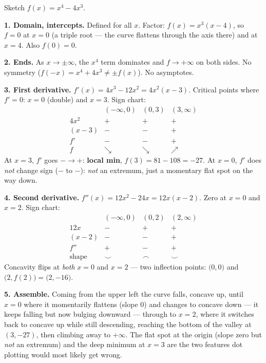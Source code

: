\begin{example}\label{ch16:ex-sketch-quartic}
Sketch $f(x)=x^4-4x^3$.

\smallskip
\textbf{1. Domain, intercepts.} Defined for all $x$. Factor:
$f(x)=x^3(x-4)$, so $f=0$ at $x=0$ (a triple root --- the curve flattens through
the axis there) and at $x=4$. Also $f(0)=0$.

\textbf{2. Ends.} As $x\to\pm\infty$, the $x^4$ term dominates and $f\to+\infty$ on
both sides. No symmetry ($f(-x)=x^4+4x^3\neq\pm f(x)$). No asymptotes.

\textbf{3. First derivative.} $f'(x)=4x^3-12x^2=4x^2(x-3)$. Critical points where
$f'=0$: $x=0$ (double) and $x=3$. Sign chart:
\[
\begin{array}{c|ccc}
& (-\infty,0) & (0,3) & (3,\infty)\\\hline
4x^2 & + & + & +\\
(x-3) & - & - & +\\
f' & - & - & +\\
f & \searrow & \searrow & \nearrow
\end{array}
\]
At $x=3$, $f'$ goes $-\to+$: \textbf{local min}, $f(3)=81-108=-27$. At $x=0$, $f'$
does \emph{not} change sign ($-$ to $-$): \emph{not} an extremum, just a momentary
flat spot on the way down.

\textbf{4. Second derivative.} $f''(x)=12x^2-24x=12x(x-2)$. Zero at $x=0$ and
$x=2$. Sign chart:
\[
\begin{array}{c|ccc}
& (-\infty,0) & (0,2) & (2,\infty)\\\hline
12x & - & + & +\\
(x-2) & - & - & +\\
f'' & + & - & +\\
\text{shape} & \smile & \frown & \smile
\end{array}
\]
Concavity flips at \emph{both} $x=0$ and $x=2$ --- two inflection points:
$\big(0,0\big)$ and $\big(2,f(2)\big)=\big(2,-16\big)$.

\textbf{5. Assemble.} Coming from the upper left the curve falls, concave up, until
$x=0$ where it momentarily flattens (slope $0$) and changes to concave down ---
it keeps falling but now bulging downward --- through to $x=2$, where it switches
back to concave up while still descending, reaching the bottom of the valley at
$(3,-27)$, then climbing away to $+\infty$. The flat spot at the origin (slope zero
but \emph{not} an extremum) and the deep minimum at $x=3$ are the two features dot
plotting would most likely get wrong.
\end{example}

